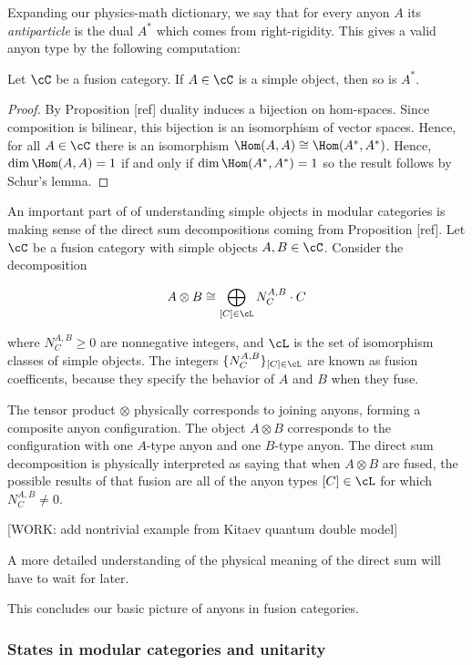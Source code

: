 Expanding our physics-math dictionary, we say that for every anyon $A$ its \textit{antiparticle} is the dual $A^*$ which comes from right-rigidity. This gives a valid anyon type by the following computation:

\begin{prop} Let $\cC$ be a fusion category. If $A\in \cC$ is a simple object, then so is $A^*$.
\end{prop}
\begin{proof} By Proposition [ref] duality induces a bijection on hom-spaces. Since composition is bilinear, this bijection is an isomorphism of vector spaces. Hence, for all $A\in \cC$ there is an isomorphism $\Hom(A,A)\cong \Hom(A^*,A^*)$.  Hence, $\dim \Hom(A,A)= 1$ if and only if $\dim \Hom(A^*,A^*)=1$ so the result follows by Schur's lemma.
\end{proof}

An important part of of understanding simple objects in modular categories is making sense of the direct sum decompositions coming from Proposition [ref]. Let $\cC$ be a fusion category with simple objects $A,B\in \cC$. Consider the decomposition

$$A\otimes B \cong \bigoplus_{[C]\in \cL}N^{A,B}_{C}\cdot C$$

where $N^{A,B}_{C}\geq 0$ are nonnegative integers, and $\cL$ is the set of isomorphism classes of simple objects. The integers $\{N^{A,B}_C\}_{[C]\in \cL}$ are known as fusion coefficents, because they specify the behavior of $A$ and $B$ when they fuse.

The tensor product $\otimes$ physically corresponds to joining anyons, forming a composite anyon configuration. The object $A\otimes B$ corresponds to the configuration with one $A$-type anyon and one $B$-type anyon. The direct sum decomposition is physically interpreted as saying that when $A\otimes B$ are fused, the possible results of that fusion are all of the anyon types $[C]\in \cL$ for which $N^{A,B}_{C}\neq 0$.

[WORK: add nontrivial example from Kitaev quantum double model]

A more detailed understanding of the physical meaning of the direct sum will have to wait for later.

This concludes our basic picture of anyons in fusion categories.

\subsubsection{States in modular categories and unitarity}

